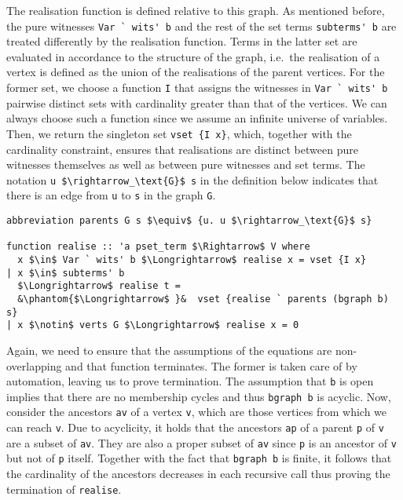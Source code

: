 \documentclass[sigplan,10pt,anonymous,review]{acmart}
\begin{document}
The realisation function is defined relative to this graph.
As mentioned before, the pure witnesses \lstinline!Var ` wits' b! and the rest of the set terms \lstinline!subterms' b! are treated differently by the realisation function.
Terms in the latter set are evaluated in accordance to the structure of the graph, i.e.\ the realisation of a vertex is defined as the union of the realisations of the parent vertices. 
For the former set, we choose a function \lstinline!I! that assigns the witnesses in \lstinline!Var ` wits' b! pairwise distinct sets with cardinality greater than that of the vertices.
We can always choose such a function since we assume an infinite universe of variables.
Then, we return the singleton set \lstinline!vset {I x}!, which, together with the cardinality constraint, ensures that realisations are distinct between pure witnesses themselves as well as between pure witnesses and set terms.  
The notation \lstinline!u $\rightarrow_\text{G}$ s! in the definition below indicates that there is an edge from \lstinline!u! to \lstinline!s! in the graph \lstinline!G!.
\begin{lstlisting}
abbreviation parents G s $\equiv$ {u. u $\rightarrow_\text{G}$ s}

function realise :: 'a pset_term $\Rightarrow$ V where
  x $\in$ Var ` wits' b $\Longrightarrow$ realise x = vset {I x}
| x $\in$ subterms' b
  $\Longrightarrow$ realise t =
  &\phantom{$\Longrightarrow$ }&  vset {realise ` parents (bgraph b) s}
| x $\notin$ verts G $\Longrightarrow$ realise x = 0
\end{lstlisting}

Again, we need to ensure that the assumptions of the equations are non-overlapping and that function terminates.
The former is taken care of by automation, leaving us to prove termination.
The assumption that \lstinline!b! is open implies that there are no membership cycles and thus \lstinline!bgraph b! is acyclic.
Now, consider the ancestors \lstinline!av! of a vertex \lstinline!v!, which are those vertices from which we can reach \lstinline!v!.
Due to acyclicity, it holds that the ancestors \lstinline!ap! of a parent \lstinline!p! of \lstinline!v! are a subset of \lstinline!av!.
They are also a proper subset of \lstinline!av! since \lstinline!p! is an ancestor of \lstinline!v! but not of \lstinline!p! itself.
Together with the fact that \lstinline!bgraph b! is finite, it follows that the cardinality of the ancestors decreases in each recursive call thus proving the termination of \lstinline!realise!.
\end{document}
